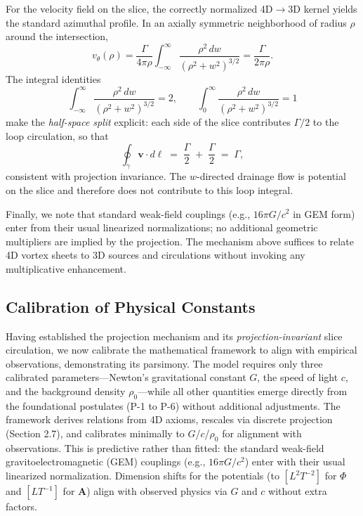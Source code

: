 For the velocity field on the slice, the correctly normalized 4D$\!\to$3D kernel yields the standard azimuthal profile. In an axially symmetric neighborhood of radius $\rho$ around the intersection,
\begin{equation}
v_\theta(\rho)
= \frac{\Gamma}{4\pi\rho} \int_{-\infty}^{\infty} \frac{\rho^2\,dw}{(\rho^2 + w^2)^{3/2}}
= \frac{\Gamma}{2\pi\rho}.
\end{equation}
The integral identities
\[
\int_{-\infty}^{\infty} \frac{\rho^2\,dw}{(\rho^2 + w^2)^{3/2}}=2, 
\qquad
\int_{0}^{\infty} \frac{\rho^2\,dw}{(\rho^2 + w^2)^{3/2}}=1
\]
make the \emph{half-space split} explicit: each side of the slice contributes $\Gamma/2$ to the loop circulation, so that
\[
\oint_{\gamma}\mathbf v\cdot d\boldsymbol{\ell} \;=\; \frac{\Gamma}{2} \;+\; \frac{\Gamma}{2} \;=\; \Gamma,
\]
consistent with projection invariance. The $w$-directed drainage flow is potential on the slice and therefore does not contribute to this loop integral.

Finally, we note that standard weak-field couplings (e.g., $16\pi G/c^2$ in GEM form) enter from their usual linearized normalizations; no additional geometric multipliers are implied by the projection. The mechanism above suffices to relate 4D vortex sheets to 3D sources and circulations without invoking any multiplicative enhancement.

\subsection{Calibration of Physical Constants}

Having established the projection mechanism and its \emph{projection-invariant} slice circulation, we now calibrate the mathematical framework to align with empirical observations, demonstrating its parsimony. The model requires only three calibrated parameters---Newton's gravitational constant $G$, the speed of light $c$, and the background density $\rho_0$---while all other quantities emerge directly from the foundational postulates (P-1 to P-6) without additional adjustments. The framework derives relations from 4D axioms, rescales via discrete projection (Section 2.7), and calibrates minimally to $G$/$c$/$\rho_0$ for alignment with observations. This is predictive rather than fitted: the standard weak-field gravitoelectromagnetic (GEM) couplings (e.g., $16\pi G/c^2$) enter with their usual linearized normalization. Dimension shifts for the potentials (to $[L^2 T^{-2}]$ for $\Phi$ and $[L T^{-1}]$ for $\mathbf{A}$) align with observed physics via $G$ and $c$ without extra factors.

